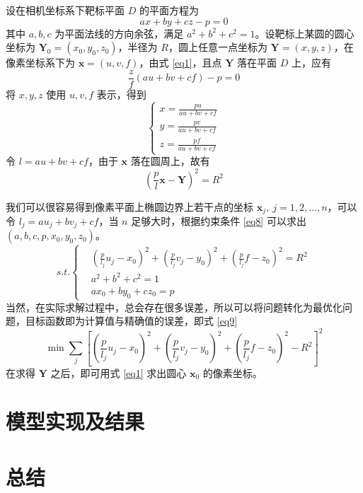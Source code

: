 \documentclass{article}
\numberwithin{equation}{section}						%
\numberwithin{figure}{section}							%
\begin{document}
\begin{sloppypar}
	设在相机坐标系下靶标平面 $D$ 的平面方程为
	\begin{equation}
		ax +by + cz -p = 0
	\end{equation}
	其中 $a, b, c$ 为平面法线的方向余弦，满足 $a^2 + b^2 + c^2 = 1$。设靶标上某圆的圆心坐标为 ${\bm Y_0} = (x_0, y_0, z_0)$，半径为 $R$，圆上任意一点坐标为 ${\bm Y} = (x, y, z)$，在像素坐标系下为 ${\bm x} = (u, v, f)$，由式 \ref{eq1}，且点 ${\bm Y}$ 落在平面 $D$ 上，应有
	\begin{equation}
		\frac{z}{f}(au + bv + cf) - p = 0
	\end{equation}
	将 $x, y, z$ 使用 $u, v, f$ 表示，得到
	\begin{equation}
		\left\lbrace
		\begin{aligned}
			x = \frac{pu}{au + bv + cf} \\
			y = \frac{pv}{au + bv + cf} \\
			z = \frac{pf}{au + bv + cf}
		\end{aligned}
		\right.
	\end{equation}
	令 $l = au + bv + cf$，由于 ${\bm x}$ 落在圆周上，故有
	\begin{equation}
		\left(\frac{p}{l}{\bm x} - {\bm Y} \right)^2 = R^2
	\end{equation}
	
	我们可以很容易得到像素平面上椭圆边界上若干点的坐标 ${\bm x_j}, \ j = 1, 2, \dots, n$，可以令 $l_j = au_j + bv_j + cf$，当 $n$ 足够大时，根据约束条件 \ref{eq8} 可以求出 $(a, b, c, p, x_0, y_0, z_0)$。
	\begin{equation}
		s.t.\left\lbrace
		\begin{aligned}
			&\left(\frac{p}{l_j}u_j - x_0 \right)^2 + \left(\frac{p}{l_j}v_j - y_0 \right)^2 + \left(\frac{p}{l_j}f - z_0 \right)^2= R^2 \\
			&a^2 + b^2 + c^2 = 1 \\
			&ax_0 + by_0 + cz_0 = p
		\end{aligned}
		\right.
		\label{eq8}
	\end{equation}
	当然，在实际求解过程中，总会存在很多误差，所以可以将问题转化为最优化问题，目标函数即为计算值与精确值的误差，即式 \ref{eq9}
	\begin{equation}
		\min\sum_{j}\left[ \left(\frac{p}{l_j}u_j - x_0 \right)^2 + \left(\frac{p}{l_j}v_j - y_0 \right)^2 + \left(\frac{p}{l_j}f - z_0 \right)^2 - R^2 \right]^2
		\label{eq9}
	\end{equation}
	在求得 $\bm Y$ 之后，即可用式 \ref{eq1} 求出圆心 ${\bm x_0}$ 的像素坐标。
	\section{模型实现及结果}
	\section{总结}
	
\end{sloppypar}
\end{document}
